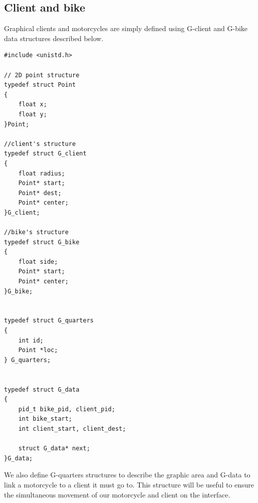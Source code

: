 \subsection{Client and bike}
Graphical clients and motorcycles are simply defined using G-client and G-bike data structures described below.
 \begin{lstlisting}[style=customc, caption={structures for user interface}]
#include <unistd.h>

// 2D point structure
typedef struct Point
{
    float x;
    float y;
}Point;

//client's structure
typedef struct G_client
{
    float radius;
    Point* start;
    Point* dest;
    Point* center;
}G_client;

//bike's structure
typedef struct G_bike
{
    float side;
    Point* start;
    Point* center;
}G_bike;


typedef struct G_quarters 
{
    int id;
    Point *loc;
} G_quarters;


typedef struct G_data
{
    pid_t bike_pid, client_pid;
    int bike_start;
    int client_start, client_dest;

    struct G_data* next;   
}G_data;
\end{lstlisting}
We also define G-quarters structures to describe the graphic area and G-data to link a motorcycle to a client it must go to. This structure will be useful to ensure the simultaneous movement of our motorcycle and client on the interface.